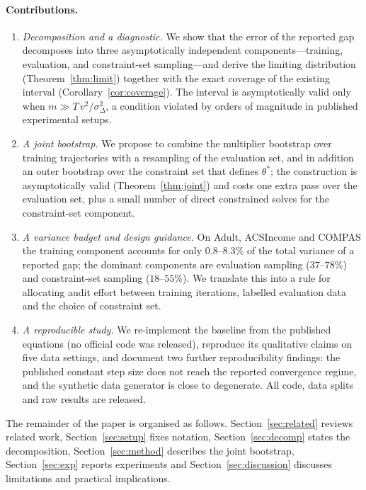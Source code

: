 \documentclass[10pt,twocolumn]{article}
\begin{document}
\paragraph{Contributions.}
\begin{enumerate}
  \item \emph{Decomposition and a diagnostic.}  We show that the error of the reported gap decomposes
        into three asymptotically independent components---training, evaluation, and constraint-set
        sampling---and derive the limiting distribution (Theorem~\ref{thm:limit}) together with the
        exact coverage of the existing interval (Corollary~\ref{cor:coverage}).  The interval is
        asymptotically valid only when $m \gg T\,v^2/\sigma^2_\Delta$, a condition violated by orders
        of magnitude in published experimental setups.
  \item \emph{A joint bootstrap.}  We propose to combine the multiplier bootstrap over training
        trajectories with a resampling of the evaluation set, and in addition an outer bootstrap over
        the constraint set that defines $\theta^*$; the construction is asymptotically valid
        (Theorem~\ref{thm:joint}) and costs one extra pass over the evaluation set, plus a small
        number of direct constrained solves for the constraint-set component.
  \item \emph{A variance budget and design guidance.}  On Adult, ACSIncome and COMPAS the training
        component accounts for only $0.8$--$8.3\%$ of the total variance of a reported gap; the
        dominant components are evaluation sampling ($37$--$78\%$) and constraint-set sampling
        ($18$--$55\%$).  We translate this into a rule for allocating audit effort between training
        iterations, labelled evaluation data and the choice of constraint set.
  \item \emph{A reproducible study.}  We re-implement the baseline from the published equations
        (no official code was released), reproduce its qualitative claims on five data settings, and
        document two further reproducibility findings: the published constant step size does not
        reach the reported convergence regime, and the synthetic data generator is close to
        degenerate.  All code, data splits and raw results are released.
\end{enumerate}

The remainder of the paper is organised as follows.  Section~\ref{sec:related} reviews related work,
Section~\ref{sec:setup} fixes notation, Section~\ref{sec:decomp} states the decomposition,
Section~\ref{sec:method} describes the joint bootstrap, Section~\ref{sec:exp} reports experiments and
Section~\ref{sec:discussion} discusses limitations and practical implications.
\end{document}
